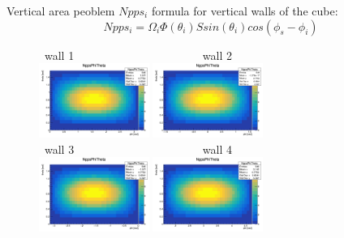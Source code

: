 \documentclass{beamer}
\begin{document}
\begin{frame}{Vertical area peoblem}
$Npps_i$ formula for vertical walls of the cube:
\[
Npps_i = \Omega_i \Phi(\theta_i) S sin(\theta_i) cos (\phi_s - \phi_i)
\]
\begin{figure}
~wall 1~~~~~~~~~~~~~~~~~~~~~~ wall 2\\
\includegraphics[width=0.32\textwidth]{images/Wall1FluxMap.png}%
\includegraphics[width=0.32\textwidth]{images/Wall2FluxMap.png}\\
~wall 3~~~~~~~~~~~~~~~~~~~~~~ wall 4\\
\includegraphics[width=0.32\textwidth]{images/Wall3FluxMap.png}%
\includegraphics[width=0.32\textwidth]{images/Wall4FluxMap.png}\\
\end{figure}
\end{frame}
\end{document}
